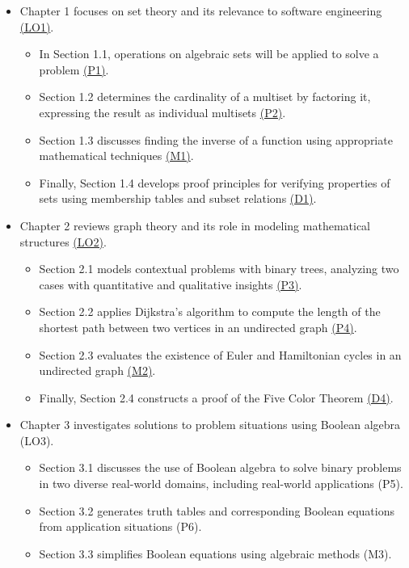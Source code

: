 \documentclass[12pt, a4paper, twoside]{report} %
\begin{document}
\begin{itemize}
  \item Chapter 1 focuses on set theory and its relevance to software engineering \hyperref[chap:LO1]{(LO1)}.
  \begin{itemize}
    \item In Section 1.1, operations on algebraic sets will be applied to solve a problem \hyperref[sec:P1]{(P1)}.
    \item Section 1.2 determines the cardinality of a multiset by factoring it, expressing the result as individual multisets \hyperref[sec:P1]{(P2)}.
    \item Section 1.3 discusses finding the inverse of a function using appropriate mathematical techniques \hyperref[sec:M1]{(M1)}.
    \item Finally, Section 1.4 develops proof principles for verifying properties of sets using membership tables and subset relations \hyperref[sec:D1]{(D1)}.
  \end{itemize}
  \item Chapter 2 reviews graph theory and its role in modeling mathematical structures \hyperref[chap:LO2]{(LO2)}.
  \begin{itemize}
    \item Section 2.1 models contextual problems with binary trees, analyzing two cases with quantitative and qualitative insights \hyperref[sec:P3]{(P3)}.
    \item Section 2.2 applies Dijkstra's algorithm to compute the length of the shortest path between two vertices in an undirected graph \hyperref[sec:P4]{(P4)}.
    \item Section 2.3 evaluates the existence of Euler and Hamiltonian cycles in an undirected graph \hyperref[sec:M2]{(M2)}.
    \item Finally, Section 2.4 constructs a proof of the Five Color Theorem \hyperref[sec:D4]{(D4)}.
  \end{itemize}
  \item Chapter 3 investigates solutions to problem situations using Boolean algebra (LO3).
  \begin{itemize}
    \item Section 3.1 discusses the use of Boolean algebra to solve binary problems in two diverse real-world domains, including real-world applications (P5).
    \item Section 3.2 generates truth tables and corresponding Boolean equations from application situations (P6).
    \item Section 3.3 simplifies Boolean equations using algebraic methods (M3).

\end{itemize}
\end{itemize}
\end{document}
